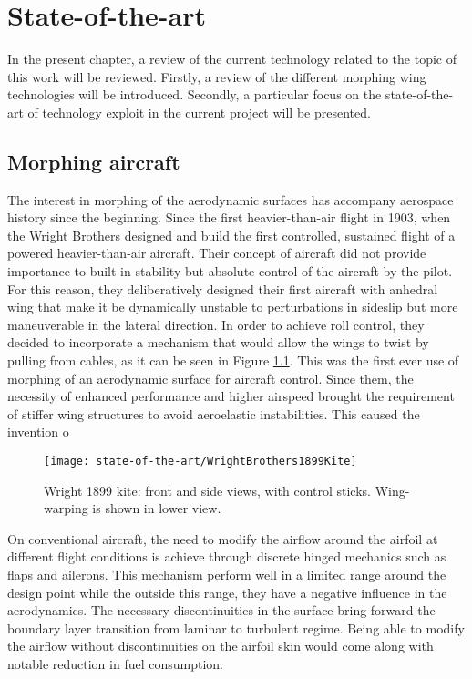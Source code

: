 \chapter{State-of-the-art} \label{chap:State_of_the_art}

In the present chapter, a review of the current technology related to the topic of this work will be reviewed. Firstly, a review of the different morphing wing technologies will be introduced. Secondly, a particular focus on the state-of-the-art of technology exploit in the current project will be presented.

\section{Morphing aircraft} \label{sec:Morphing_state}

  The interest in morphing of the aerodynamic surfaces has accompany aerospace history since the beginning. Since the first heavier-than-air flight in 1903, when the Wright Brothers designed and build the first controlled, sustained flight of a powered heavier-than-air aircraft. Their concept of aircraft did not provide importance to built-in stability but absolute control of the aircraft by the pilot. For this reason, they deliberatively designed their first aircraft with anhedral wing that make it be dynamically unstable to perturbations in sideslip but more maneuverable in the lateral direction. In order to achieve roll control, they decided to incorporate a mechanism that would allow the wings to twist by pulling from cables, as it can be seen in Figure \ref{fig:Wright}. This was the first ever use of morphing of an aerodynamic surface for aircraft control. Since them, the necessity of enhanced performance and higher airspeed brought the requirement of stiffer wing structures to avoid aeroelastic instabilities. This caused the invention o

  \begin{figure}[!htpb]
    \centering
    \texttt{[image: state-of-the-art/WrightBrothers1899Kite]}
    \caption[Wright Brothers 1899 kite]{Wright 1899 kite: front and side views, with control sticks. Wing-warping is shown in lower view. \cite{Wright}}\label{fig:Wright}
  \end{figure}

  On conventional aircraft, the need to modify the airflow around the airfoil at different flight conditions is achieve through discrete hinged mechanics such as flaps and ailerons. This mechanism perform well in a limited range around the design point while the outside this range, they have a negative influence in the aerodynamics. The necessary discontinuities in the surface bring forward the boundary layer transition from laminar to turbulent regime. Being able to modify the airflow without discontinuities on the airfoil skin would come along with notable reduction in fuel consumption.

